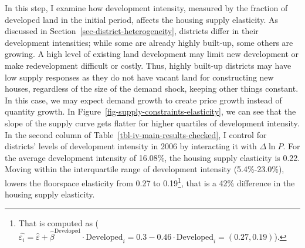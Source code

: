 \documentclass[
  12pt,
]{article}
\begin{document}
In this step, I examine how development intensity, measured by the
fraction of developed land in the initial period, affects the housing
supply elasticity. As discussed in
Section~\ref{sec-district-heterogeneity}, districts differ in their
development intensities; while some are already highly built-up, some
others are growing. A high level of existing land development may limit
new development or make redevelopment difficult or costly. Thus, highly
built-up districts may have low supply responses as they do not have
vacant land for constructing new houses, regardless of the size of the
demand shock, keeping other things constant. In this case, we may expect
demand growth to create price growth instead of quantity growth. In
Figure~\ref{fig-supply-constraints-elasticity}, we can see that the
slope of the supply curve gets flatter for higher quartiles of
development intensity. In the second column of
Table~\ref{tbl-iv-main-results-checked}, I control for districts' levels
of development intensity in 2006 by interacting it with \(\Delta\ln P\).
For the average development intensity of 16.08\%, the housing supply
elasticity is 0.22. Moving within the interquartile range of development
intensity (5.4\%-23.0\%), lowers the floorspace elasticity from 0.27 to
0.19\footnote{That is computed as
  (\(\widehat{\varepsilon_i} = \widehat{\varepsilon} + \widehat{\beta}^{\text{Developed}}\cdot\text{Developed}_i = 0.3 -0.46 \cdot\text{Developed}_i = (0.27, 0.19)\)).},
that is a 42\% difference in the housing supply elasticity.
\end{document}

